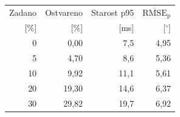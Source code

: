 \begin{tabular}{rrrr}
\hline
\small Zadano & \small Ostvareno & \small Starost p95 & \small $\overline{\text{RMSE}}_\text{p}$ \\
\small [\%] & \small [\%] & \small [ms] & \small [$^\circ$] \\
\hline
0 & 0,00 & 7,5 & 4,95 \\
5 & 4,70 & 8,6 & 5,36 \\
10 & 9,92 & 11,1 & 5,61 \\
20 & 19,30 & 14,6 & 6,37 \\
30 & 29,82 & 19,7 & 6,92 \\
\hline
\end{tabular}
